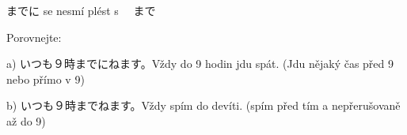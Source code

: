 までに se nesmí plést s 　まで　

Porovnejte:

a) いつも９時までにねます。Vždy do 9 hodin jdu spát. (Jdu nějaký čas před 9 nebo přímo v 9)

b) いつも９時までねます。Vždy spím do devíti. (spím před tím a nepřerušovaně až do 9)




























